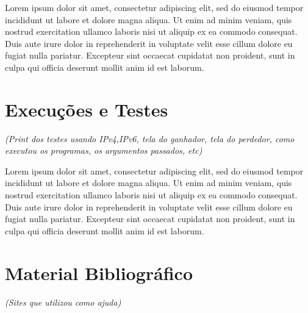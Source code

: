 \documentclass[12pt]{article}
\begin{document}
Lorem ipsum dolor sit amet, consectetur adipiscing elit, sed do eiusmod tempor incididunt ut labore et dolore magna aliqua. Ut enim ad minim veniam, quis nostrud exercitation ullamco laboris nisi ut aliquip ex ea commodo consequat. Duis aute irure dolor in reprehenderit in voluptate velit esse cillum dolore eu fugiat nulla pariatur. Excepteur sint occaecat cupidatat non proident, sunt in culpa qui officia deserunt mollit anim id est laborum.

\section{Execuções e Testes}

\textit{(Print dos testes usando IPv4,IPv6, tela do ganhador, tela do perdedor, como executou os programas, os argumentos passados, etc)}

Lorem ipsum dolor sit amet, consectetur adipiscing elit, sed do eiusmod tempor incididunt ut labore et dolore magna aliqua. Ut enim ad minim veniam, quis nostrud exercitation ullamco laboris nisi ut aliquip ex ea commodo consequat. Duis aute irure dolor in reprehenderit in voluptate velit esse cillum dolore eu fugiat nulla pariatur. Excepteur sint occaecat cupidatat non proident, sunt in culpa qui officia deserunt mollit anim id est laborum.

\section{Material Bibliográfico}
\textit{(Sites que utilizou como ajuda)}
\end{document}
